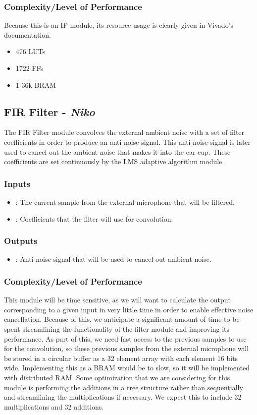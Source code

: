 \documentclass{fpgairpods}
\begin{document}
\begin{multicols*}{2}
\subsubsection{Complexity/Level of Performance}
Because this is an IP module, its resource usage is clearly given in Vivado's documentation.
\begin{itemize}
    \item 476 LUTs
    \item 1722 FFs
    \item 1 36k BRAM
\end{itemize}

\subsection{FIR Filter - \textit{Niko}}
The FIR Filter module convolves the external ambient noise with a set of filter coefficients in order to produce an anti-noise signal. This anti-noise signal is later used to cancel out the ambient noise that makes it into the ear cup. These coefficients are set continuously by the LMS adaptive algorithm module.
\subsubsection{Inputs}
\begin{itemize}
    \item {}: The current sample from the external microphone that will be filtered.
    \item {}: Coefficients that the filter will use for convolution.
\end{itemize}
\subsubsection{Outputs}
\begin{itemize}
    \item {}: Anti-noise signal that will be used to cancel out ambient noise.
\end{itemize}
\subsubsection{Complexity/Level of Performance}
This module will be time sensitive, as we will want to calculate the output corresponding to a given input in very little time in order to enable effective noise cancellation. Because of this, we anticipate a significant amount of time to be spent streamlining the functionality of the filter module and improving its performance. As part of this, we need fast access to the previous samples to use for the convolution, so these previous samples from the external microphone will be stored in a circular buffer as a 32 element array with each element 16 bits wide. Implementing this as a BRAM would be to slow, so it will be implemented with distributed RAM. Some optimization that we are considering for this module is performing the additions in a tree structure rather than sequentially and streamlining the multiplications if necessary. We expect this to include 32 multiplications and 32 additions.


\end{multicols*}
\end{document}
